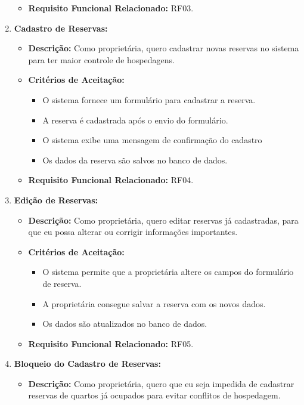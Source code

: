 \documentclass[
	12pt,				%
	openany,			%
	twoside,			%
	a4paper,			%
	english,			%
	french,				%
	spanish,			%
	brazil				%
	]{abntex2}
\begin{document}
\begin{enumerate}[label=\textbf{\arabic*.}]
\begin{itemize}
\begin{itemize}
	 		\end{itemize}
	 		\item \textbf{Requisito Funcional Relacionado:} RF03.
	 	\end{itemize} 
	 \item \textbf{Cadastro de Reservas:}
	 \begin{itemize}
	 	\item \textbf{Descrição:} Como proprietária, quero cadastrar novas reservas no sistema para ter maior controle de hospedagens.
	 	\item \textbf{Critérios de Aceitação:}
	 	\begin{itemize}
	 		\item O sistema fornece um formulário para cadastrar a reserva.
	 		\item A reserva é cadastrada após o envio do formulário.
	 		\item O sistema exibe uma mensagem de confirmação do cadastro
	 		\item Os dados da reserva são salvos no banco de dados. 
	 	\end{itemize}
	 	\item \textbf{Requisito Funcional Relacionado:} RF04.
	 \end{itemize} 
	  \item \textbf{Edição de Reservas:}
	 \begin{itemize}
	 	\item \textbf{Descrição:} Como proprietária,  quero editar reservas já cadastradas,  para que eu possa alterar ou corrigir informações importantes.
	 	\item \textbf{Critérios de Aceitação:}
	 	\begin{itemize}
	 		\item O sistema permite que a proprietária altere os campos do formulário de reserva.
	 		\item A proprietária consegue salvar a reserva com os novos dados.
	 		\item Os dados são atualizados no banco de dados.
	 	\end{itemize}
	 	\item \textbf{Requisito Funcional Relacionado:} RF05.
	 \end{itemize} 
	  \item \textbf{Bloqueio do Cadastro de Reservas:}
	 \begin{itemize}
	 	\item \textbf{Descrição:} Como proprietária, quero que eu seja impedida de cadastrar reservas de quartos já ocupados para evitar conflitos de hospedagem.

\end{itemize}
\end{enumerate}
\end{document}
